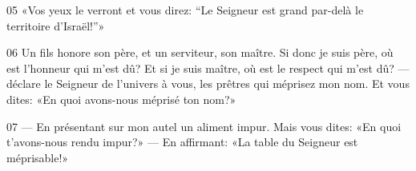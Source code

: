 
05 «Vos yeux le verront et vous direz: “Le Seigneur est grand par-delà le territoire d’Israël!”»

06 Un fils honore son père, et un serviteur, son maître. Si donc je suis père, où est l’honneur qui m’est dû? Et si je suis maître, où est le respect qui m’est dû? --- déclare le Seigneur de l’univers à vous, les prêtres qui méprisez mon nom. Et vous dites: «En quoi avons-nous méprisé ton nom?»

07 --- En présentant sur mon autel un aliment impur. Mais vous dites: «En quoi t’avons-nous rendu impur?» --- En affirmant: «La table du Seigneur est méprisable!»
